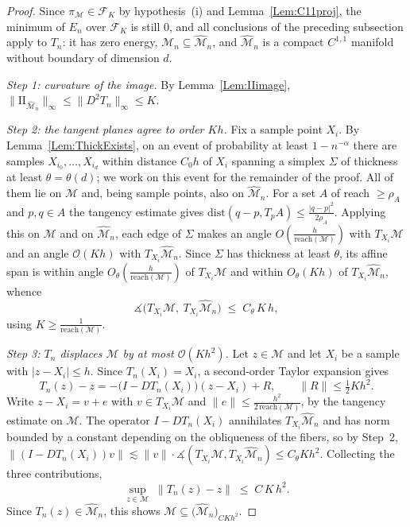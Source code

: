\documentclass[11pt]{amsart}%
\theoremstyle{plain}
\newcommand{\1}{\mathbf{1}}
\newcommand{\M}{\mathcal{M}}
\newcommand{\II}{\mathrm{I\!I}}   %
\begin{document}
\begin{proof}
    Since $\pi_\M\in\mathcal F_K$ by hypothesis~(i) and Lemma~\ref{Lem:C11proj}, the minimum of
    $E_n$ over $\mathcal F_K$ is still $0$, and all conclusions of the preceding
    subsection apply to $T_n$: it has zero energy, $\M_n\subseteq\widehat{\M}_n$, and
    $\widehat{\M}_n$ is a compact $C^{1,1}$ manifold without boundary of dimension $d$.

    \emph{Step 1: curvature of the image.} By Lemma~\ref{Lem:IIimage},
    $\|\II_{\widehat{\M}_n}\|_\infty\le\|D^2T_n\|_\infty\le K$.

    \emph{Step 2: the tangent planes agree to order $Kh$.} Fix a sample point $X_i$. By
    Lemma~\ref{Lem:ThickExists}, on an event of probability at least $1-n^{-\alpha}$ there are
    samples $X_{i_0},\dots,X_{i_d}$ within distance $C_0h$ of $X_i$ spanning a simplex $\Sigma$ of
    thickness at least $\theta=\theta(d)$; we work on this event for the remainder of the proof. All of them lie on $\M$ and, being sample
    points, also on $\widehat{\M}_n$. For a set $A$ of reach $\ge\rho_A$ and $p,q\in A$ the
    tangency estimate gives $\mathrm{dist}(q-p,T_pA)\le\frac{|q-p|^2}{2\rho_A}$. Applying this on $\M$ and
    on $\widehat{\M}_n$, each edge of $\Sigma$ makes an angle
    $O\left(\frac{h}{\mathrm{reach}(\M)}\right)$ with $T_{X_i}\M$ and an angle $\mathcal{O}(Kh)$ with $T_{X_i}\widehat{\M}_n$.
    Since $\Sigma$ has thickness at least $\theta$, its affine span is within angle
    $O_\theta\left(\frac{h}{\mathrm{reach}(\M)}\right)$ of $T_{X_i}\M$ and within $O_\theta(Kh)$ of
    $T_{X_i}\widehat{\M}_n$, whence
    \[
        \measuredangle\bigl(T_{X_i}\M,\ T_{X_i}\widehat{\M}_n\bigr)\;\le\;C_\theta\,K\,h ,
    \]
    using $K\ge \frac{1}{\mathrm{reach}(\M)}$.

    \emph{Step 3: $T_n$ displaces $\M$ by at most $\mathcal{O}(Kh^2)$.} Let $z\in \M$ and let $X_i$ be a sample
    with $|z-X_i|\le h$. Since $T_n(X_i)=X_i$, a second-order Taylor expansion gives
    \[
        T_n(z)-z=-\bigl(I-DT_n(X_i)\bigr)(z-X_i)+R,\qquad \|R\|\le\tfrac12 K h^2 .
    \]
    Write $z-X_i=v+e$ with $v\in T_{X_i}\M$ and $\|e\|\le \frac{h^2}{2\,\mathrm{reach}(\M)}$, by
    the tangency estimate on $\M$. The operator $I-DT_n(X_i)$ annihilates
    $T_{X_i}\widehat{\M}_n$ and has norm bounded by a constant depending on the obliqueness of
    the fibers, so by Step~2,
    $\|(I-DT_n(X_i))v\|\lesssim \|v\|\cdot\measuredangle(T_{X_i}\M,T_{X_i}\widehat{\M}_n)\le C_\theta Kh^2$.
    Collecting the three contributions,
    \[
        \sup_{z\in \M}\;\|T_n(z)-z\|\;\le\;C\,K\,h^2 .
    \]
    Since $T_n(z)\in\widehat{\M}_n$, this shows
    $\M\subseteq\bigl(\widehat{\M}_n\bigr)_{CKh^2}$.


\end{proof}
\end{document}
